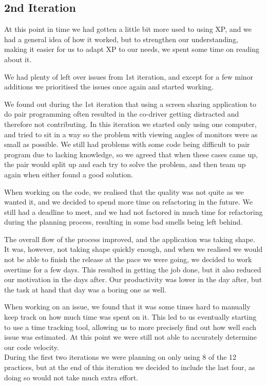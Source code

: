\subsection{2nd Iteration}
At this point in time we had gotten a little bit more used to using XP, and we had a general idea of how it worked, but to strengthen our understanding, making it easier for us to adapt XP to our needs, we spent some time on reading about it.

We had plenty of left over issues from 1st iteration, and except for a few minor additions we prioritised the issues once again and started working.

We found out during the 1st iteration that using a screen sharing application to do pair programming often resulted in the co-driver getting distracted and therefore not contributing. In this iteration we started only using one computer, and tried to sit in a way so the problem with viewing angles of monitors were as small as possible. We still had problems with some code being difficult to pair program due to lacking knowledge, so we agreed that when these cases came up, the pair would split up and each try to solve the problem, and then team up again when either found a good solution.

When working on the code, we realised that the quality was not quite as we wanted it, and we decided to spend more time on refactoring in the future. We still had a deadline to meet, and we had not factored in much time for refactoring during the planning process, resulting in some bad smells being left behind.


The overall flow of the process improved, and the application was taking shape. It was, however, not taking shape quickly enough, and when we realised we would not be able to finish the release at the pace we were going, we decided to work overtime for a few days. This resulted in getting the job done, but it also reduced our motivation in the days after. Our productivity was lower in the day after, but the task at hand that day was a boring one as well.\\


When working on an issue, we found that it was some times hard to manually keep track on how much time was spent on it. This led to us eventually starting to use a time tracking tool, allowing us to more precisely find out how well each issue was estimated. At this point we were still not able to accurately determine our code velocity.\\

During the first two iterations we were planning on only using 8 of the 12 practices, but at the end of this iteration we decided to include the last four, as doing so would not take much extra effort.

